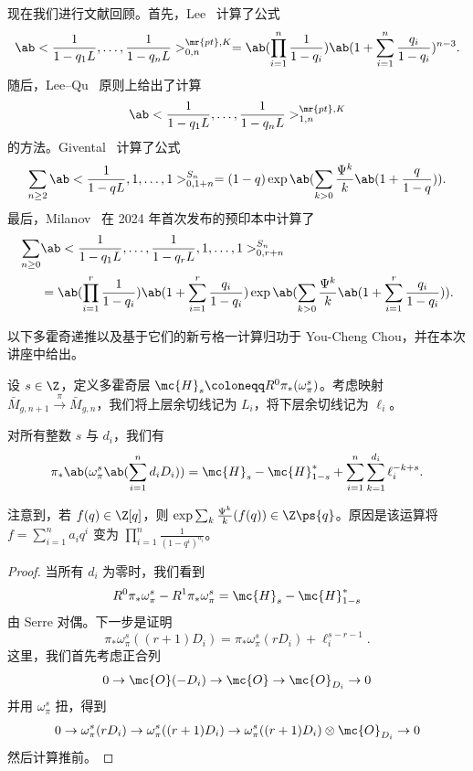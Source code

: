 现在我们进行文献回顾。首先，Lee~\cite{Lee1997} 计算了公式
\[ \ab<\frac{1}{1-q_1 L}, \ldots, \frac{1}{1-q_n L}>_{0,n}^{\mr{pt}, K} = \ab(\prod_{i=1}^n \frac{1}{1-q_i}) \ab(1 + \sum_{i=1}^n \frac{q_i}{1-q_i})^{n-3}. \]
随后，Lee--Qu~\cite{LeeQu2014} 原则上给出了计算
\[ \ab<\frac{1}{1-q_1 L}, \ldots, \frac{1}{1-q_n L}>_{1,n}^{\mr{pt}, K} \]
的方法。Givental~\cite{Givental2017K1} 计算了公式
\[ \sum_{n \geq 2} \ab<\frac{1}{1-q L}, 1, \ldots, 1>_{0,1+n}^{S_n} = (1-q) \exp\ab(\sum_{k > 0} \frac{\Psi^k}{k} \ab(1 + \frac{q}{1-q})). \]
最后，Milanov~\cite{Milanov2025} 在 2024 年首次发布的预印本中计算了
\begin{align*}
    \sum_{n \geq 0}& \ab<\frac{1}{1-q_1 L}, \ldots, \frac{1}{1-q_r L}, 1, \ldots, 1>_{0,r+n}^{S_n} \\
    &= \ab(\prod_{i=1}^{r} \frac{1}{1-q_i})\ab(1 + \sum_{i=1}^r \frac{q_i}{1-q_i}) \exp\ab(\sum_{k > 0} \frac{\Psi^k}{k} \ab(1 + \sum_{i=1}^r \frac{q_i}{1-q_i})). 
\end{align*}

以下多霍奇递推以及基于它们的新亏格一计算归功于 You-Cheng Chou，并在本次讲座中给出。

设 \(s \in \Z\)，定义多霍奇层 \(\mc{H}_s \coloneqq R^0 \pi_* (\omega_{\pi}^s)\)。考虑映射 \(\bar{M}_{g,n+1} \xrightarrow{\pi} \bar{M}_{g,n}\)，我们将上层余切线记为 \(L_i\)，将下层余切线记为 \(\ell_i\)。

\begin{lem}
    对所有整数 \(s\) 与 \(d_i\)，我们有
    \[ \pi_*\ab(\omega_{\pi}^s\ab(\sum_{i=1}^n d_i D_i)) = \mc{H}_s-\mc{H}_{1-s}^* + \sum_{i=1}^n \sum_{k=1}^{d_i} \ell_i^{-k+s}. \]
\end{lem}

\begin{rmk}
    注意到，若 \(f(q) \in \Z[q]\)，则 \(\exp \sum_k \frac{\Psi^k}{k} (f(q)) \in \Z \ps{q}\)。原因是该运算将 \(f = \sum_{i=1}^{n} a_i q^i\) 变为 \(\prod_{i=1}^n \frac{1}{(1-q^i)^{a_i}}\)。
\end{rmk}

\begin{proof}
    当所有 \(d_i\) 为零时，我们看到
    \[ R^0 \pi_* \omega_{\pi}^s - R^1 \pi_* \omega_{\pi}^s = \mc{H}_s - \mc{H}_{1-s}^* \]
    由 Serre 对偶。下一步是证明
    \[ \pi_* \omega_{\pi}^s ((r+1)D_i) = \pi_* \omega_{\pi}^s(r D_i) + \ell_i^{s-r-1}. \]
    这里，我们首先考虑正合列
    \[ 0 \to \mc{O} (-D_i) \to \mc{O} \to \mc{O}_{D_i} \to 0 \]
    并用 \(\omega_{\pi}^s\) 扭，得到
    \[ 0 \to \omega_{\pi}^s(r D_i) \to \omega_{\pi}^s ((r+1)D_i) \to \omega_{\pi}^s ((r+1)D_i) \otimes \mc{O}_{D_i} \to 0 \]
    然后计算推前。
\end{proof}

